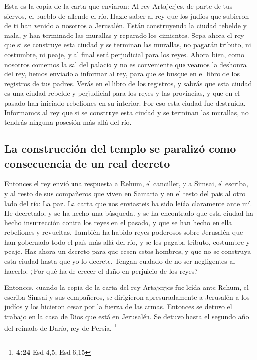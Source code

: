 \begin{paracol}{2}
 Esta es la copia de la carta que enviaron: Al rey
Artajerjes, de parte de tus siervos, el pueblo de allende el río.
 Hazle saber al rey que los judíos que subieron de ti han
venido a nosotros a Jerusalén. Están construyendo la ciudad rebelde y
mala, y han terminado las murallas y reparado los cimientos.
 Sepa ahora el rey que si se construye esta ciudad y se
terminan las murallas, no pagarán tributo, ni costumbre, ni peaje, y al
final será perjudicial para los reyes.  Ahora bien, como
nosotros comemos la sal del palacio y no es conveniente que veamos la
deshonra del rey, hemos enviado a informar al rey,  para
que se busque en el libro de los registros de tus padres. Verás en el
libro de los registros, y sabrás que esta ciudad es una ciudad rebelde y
perjudicial para los reyes y las provincias, y que en el pasado han
iniciado rebeliones en su interior. Por eso esta ciudad fue destruida.
 Informamos al rey que si se construye esta ciudad y se
terminan las murallas, no tendrás ninguna posesión más allá del río.

\hypertarget{la-construcciuxf3n-del-templo-se-paralizuxf3-como-consecuencia-de-un-real-decreto}{%
\subsection{La construcción del templo se paralizó como consecuencia de
un real
decreto}\label{la-construcciuxf3n-del-templo-se-paralizuxf3-como-consecuencia-de-un-real-decreto}}

 Entonces el rey envió una respuesta a Rehum, el
canciller, y a Simsai, el escriba, y al resto de sus compañeros que
viven en Samaria y en el resto del país al otro lado del río: La paz.
 La carta que nos enviasteis ha sido leída claramente
ante mí.  He decretado, y se ha hecho una búsqueda, y se
ha encontrado que esta ciudad ha hecho insurrección contra los reyes en
el pasado, y que se han hecho en ella rebeliones y revueltas.
 También ha habido reyes poderosos sobre Jerusalén que
han gobernado todo el país más allá del río, y se les pagaba tributo,
costumbre y peaje.  Haz ahora un decreto para que cesen
estos hombres, y que no se construya esta ciudad hasta que yo lo
decrete.  Tengan cuidado de no ser negligentes al
hacerlo. ¿Por qué ha de crecer el daño en perjuicio de los reyes?

 Entonces, cuando la copia de la carta del rey Artajerjes
fue leída ante Rehum, el escriba Simsai y sus compañeros, se dirigieron
apresuradamente a Jerusalén a los judíos y los hicieron cesar por la
fuerza de las armas.  Entonces se detuvo el trabajo en la
casa de Dios que está en Jerusalén. Se detuvo hasta el segundo año del
reinado de Darío, rey de Persia. \footnote{\textbf{4:24} Esd 4,5; Esd
  6,15}


\end{paracol}
